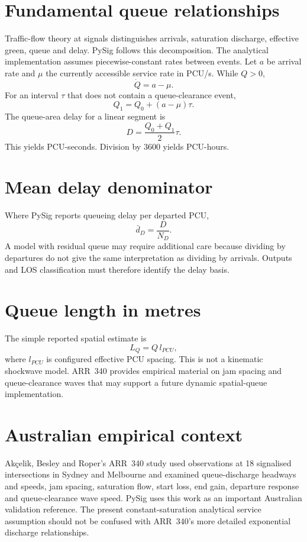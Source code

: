 \section{Fundamental queue relationships}
Traffic-flow theory at signals distinguishes arrivals, saturation discharge, effective
green, queue and delay.  PySig follows this decomposition.  The analytical implementation
assumes piecewise-constant rates between events.  Let $a$ be arrival rate and $\mu$ the
currently accessible service rate in PCU/s.  While $Q>0$,
\begin{equation}
\dot{Q}=a-\mu.
\end{equation}
For an interval $\tau$ that does not contain a queue-clearance event,
\begin{equation}
Q_1=Q_0+(a-\mu)\tau.
\end{equation}
The queue-area delay for a linear segment is
\begin{equation}
D=\frac{Q_0+Q_1}{2}\tau.
\end{equation}
This yields PCU-seconds.  Division by 3600 yields PCU-hours.

\section{Mean delay denominator}
Where PySig reports queueing delay per departed PCU,
\begin{equation}
\bar d_D=\frac{D}{N_D}.
\end{equation}
A model with residual queue may require additional care because dividing by departures
do not give the same interpretation as dividing by arrivals.  Outputs and LOS
classification must therefore identify the delay basis.

\section{Queue length in metres}
The simple reported spatial estimate is
\begin{equation}
L_Q=Q\,l_{PCU},
\end{equation}
where $l_{PCU}$ is configured effective PCU spacing.  This is not a kinematic shockwave
model.  ARR~340 provides empirical material on jam spacing and queue-clearance waves
that may support a future dynamic spatial-queue implementation.

\section{Australian empirical context}
Ak\c{c}elik, Besley and Roper's ARR~340 study used observations at 18 signalised
intersections in Sydney and Melbourne and examined queue-discharge headways and speeds,
jam spacing, saturation flow, start loss, end gain, departure response and
queue-clearance wave speed.  PySig uses this work as an important Australian validation
reference.  The present constant-saturation analytical service assumption should not be
confused with ARR~340's more detailed exponential discharge relationships.

